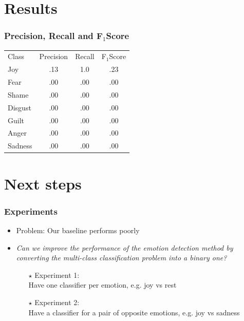 \documentclass[aspectratio=169]{beamer}
\begin{document}
\section{Results}

\begin{frame}
\frametitle{Precision, Recall and F$_1$Score}
\begin{table}
  \centering
  \begin{tabular}{l ccc}
  
    \toprule

    Class &Precision&Recall&F$_1$Score\\
    \cmidrule{1-4}

    Joy & .13 & 1.0 & .23\\
    Fear & .00 & .00 & .00\\
    Shame &  .00 & .00 & .00 \\
    Disgust & .00 & .00 & .00 \\
    Guilt & .00 & .00 & .00  \\
    Anger & .00 & .00 & .00  \\
    Sadness & .00 & .00 & .00  \\
    \bottomrule
  \end{tabular}
\end{table}

\end{frame}


\section{Next steps}

\begin{frame}
\frametitle{Experiments}

\begin{itemize}
\item Problem: Our baseline performs poorly
\setlength\itemsep{0.4em}
\item \emph{Can we improve the performance of the emotion detection method by converting the multi-class classification problem into a binary one? }
\begin{itemize}
\item [$\star$] Experiment 1:\\ Have one classifier per emotion, e.g. joy vs rest
\item [$\star$] Experiment 2:\\ Have a classifier for a pair of opposite emotions, e.g. joy vs sadness
\end{itemize}


\end{itemize}

%

\end{frame}
\end{document}
